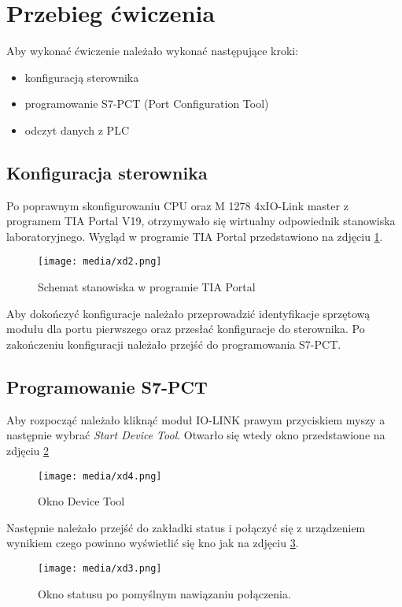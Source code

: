 \documentclass{article}
\begin{document}
\newpage
\section{Przebieg ćwiczenia}
Aby wykonać ćwiczenie należało wykonać następujące kroki:
\begin{itemize}
    \item konfiguracją sterownika
    \item programowanie S7-PCT (Port Configuration Tool)
    \item odczyt danych z PLC
\end{itemize}

\subsection{Konfiguracja sterownika}
Po poprawnym skonfigurowaniu CPU oraz M 1278 4xIO-Link master z programem TIA Portal V19, otrzymywało się wirtualny odpowiednik stanowiska laboratoryjnego. Wygląd w programie TIA Portal przedstawiono na zdjęciu \ref{fig:konfiguracja}.

\begin{figure}[H]
    \centering
    \texttt{[image: media/xd2.png]}
    \caption{Schemat stanowiska w programie TIA Portal}
    \label{fig:konfiguracja}
\end{figure}

Aby dokończyć konfiguracje należało przeprowadzić identyfikacje sprzętową modułu dla portu pierwszego oraz przesłać konfiguracje do sterownika. Po zakończeniu konfiguracji należało przejść do programowania S7-PCT.

\newpage
\subsection{Programowanie S7-PCT}
Aby rozpocząć należało kliknąć moduł IO-LINK prawym przyciskiem myszy a następnie wybrać \textit{Start Device Tool}. Otwarło się wtedy okno przedstawione na zdjęciu \ref{fig:Dev_tool}

\begin{figure}[H]
    \centering
    \texttt{[image: media/xd4.png]}
    \caption{Okno Device Tool}
    \label{fig:Dev_tool}
\end{figure}

Następnie należało przejść do zakładki status i połączyć się z urządzeniem wynikiem czego powinno wyświetlić się kno jak na zdjęciu \ref{fig:status}.

\begin{figure}[H]
    \centering
    \texttt{[image: media/xd3.png]}
    \caption{Okno statusu po pomyślnym nawiązaniu połączenia.}
    \label{fig:status}
\end{figure}
\end{document}

